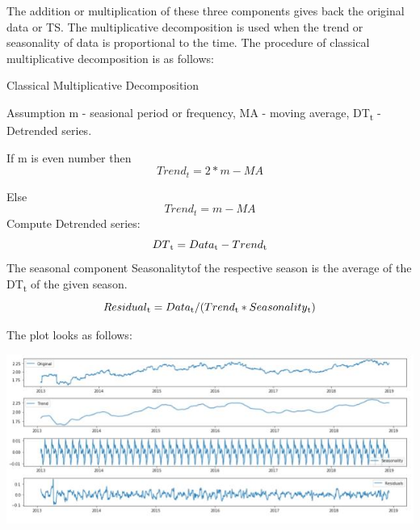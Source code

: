 			The addition or multiplication of these three components gives back the original data or TS. The multiplicative decomposition is used when the trend or seasonality of data is proportional to the time.
			The procedure of classical multiplicative decomposition \cite{18} is as follows:

				\begin{algorithm}[H]
					\caption{Classical Multiplicative Decomposition}
					Assumption m - seasional period or frequency, 
	        						MA - moving average, 
	       						DT\textsubscript{t} - Detrended series.

					\begin{algorithmic}[1] 
						\STATE If m is even number then \begin{equation}Trend_{t} = 2 * m-MA		\end{equation}

								Else \begin{equation}Trend_{t} = m-MA	\end{equation}
						\STATE Compute Detrended series:
									\begin{equation}DT\textsubscript{t} = Data\textsubscript{t} - Trend\textsubscript{t} \end{equation}
						\STATE The seasonal component Seasonalitytof the respective season is the average of the DT\textsubscript{t} of the given season.
						\STATE \begin{equation}Residual\textsubscript{t} = Data\textsubscript{t} / (Trend\textsubscript{t}  * Seasonality\textsubscript{t})	\end{equation}
					\end{algorithmic}
				\end{algorithm}

			The plot looks as follows:
				
				\begin{center}
				\includegraphics[width=\linewidth]{figures/The-trend-seasonality-and-residual-of-log-transformed-data.jpg}	
				\label{fig: The trend, seasonality and residual of log-transformed data}
				\end{center}

